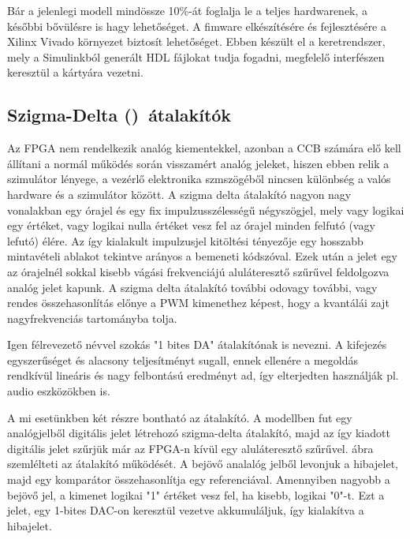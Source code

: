 Bár a jelenlegi modell mindössze 10\%-át foglalja le a teljes hardwarenek, a későbbi bővülésre is hagy lehetőséget. A fimware elkészítésére és fejlesztésére a Xilinx Vivado környezet biztosít lehetőséget. Ebben készült el a keretrendszer, mely a Simulinkból generált HDL fájlokat tudja fogadni, megfelelő interfészen keresztül a kártyára vezetni.


\subsection{Szigma-Delta (\Sigma\Delta)\ átalakítók}

Az FPGA nem rendelkezik analóg kiementekkel, azonban a CCB számára elő kell állítani a normál működés során visszamért analóg jeleket, hiszen ebben relik a szimulátor lényege, a vezérlő elektronika szmszögéből nincsen különbség a valós hardware és a szimulátor között. A szigma delta átalakító nagyon nagy vonalakban egy órajel és egy fix impulzusszélességű négyszögjel, mely vagy logikai egy értéket, vagy logikai nulla értéket vesz fel az órajel minden felfutó (vagy lefutó) élére. Az így kialakult impulzusjel kitöltési tényezője egy hosszabb mintavételi ablakot tekintve arányos a bemeneti kódszóval. Ezek után a jelet egy az órajelnél sokkal kisebb vágási frekvenciájú aluláteresztő szűrűvel feldolgozva analóg jelet kapunk. A szigma delta átalakító további odo{vagy további, vagy rendes összehasonlítás} előnye a PWM kimenethez képest, hogy a kvantálái zajt nagyfrekvenciás tartományba tolja.\cite{artofelectronics}


Igen félrevezető névvel szokás "1 bites DA" átalakítónak is nevezni. A kifejezés egyszerűséget és alacsony teljesítményt sugall, ennek ellenére a megoldás rendkívül lineáris és nagy felbontású eredményt ad, így elterjedten használják pl. audio eszközökben is.

A mi esetünkben két részre bontható az átalakító. A modellben fut egy analógjelből digitális jelet létrehozó szigma-delta átalakító, majd az így kiadott digitális jelet szűrjük már az FPGA-n kívül egy aluláteresztő szűrűvel.  ábra szemlélteti az átalakító működését. A bejövő analalóg jelből levonjuk a hibajelet, majd egy komparátor összehasonlítja egy referenciával. Amennyiben nagyobb a bejövő jel, a kimenet logikai "1" értéket vesz fel, ha kisebb, logikai "0"-t. Ezt a jelet, egy 1-bites DAC-on keresztül vezetve akkumuláljuk, így kialakítva a hibajelet. 

